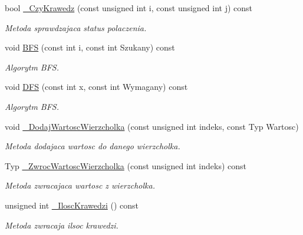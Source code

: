\begin{DoxyCompactItemize}
bool \hyperlink{class_graf_afa31377701d46bd692a6e430c6965d4b}{\-\_\-\-Czy\-Krawedz} (const unsigned int i, const unsigned int j) const 
\begin{DoxyCompactList}\small\item\em Metoda sprawdzajaca status polaczenia. \end{DoxyCompactList}\item 
void \hyperlink{class_graf_a1cef49af91f2d8b6f157e9dd06066d60}{B\-F\-S} (const int i, const int Szukany) const 
\begin{DoxyCompactList}\small\item\em Algorytm B\-F\-S. \end{DoxyCompactList}\item 
void \hyperlink{class_graf_a54e531a5abc04c9aaff81bd76aec5591}{D\-F\-S} (const int x, const int Wymagany) const 
\begin{DoxyCompactList}\small\item\em Algorytm B\-F\-S. \end{DoxyCompactList}\item 
void \hyperlink{class_graf_ae4fa759125334d0361226c4fa2dbf35e}{\-\_\-\-Dodaj\-Wartosc\-Wierzcholka} (const unsigned int indeks, const Typ Wartosc)
\begin{DoxyCompactList}\small\item\em Metoda dodajaca wartosc do danego wierzcholka. \end{DoxyCompactList}\item 
Typ \hyperlink{class_graf_a9198e4a7a0328ab5275713b4141fbb30}{\-\_\-\-Zwroc\-Wartosc\-Wierzcholka} (const unsigned int indeks) const 
\begin{DoxyCompactList}\small\item\em Metoda zwracajaca wartosc z wierzcholka. \end{DoxyCompactList}\item 
unsigned int \hyperlink{class_graf_adf42e78308217f1abbb79818abd04cdf}{\-\_\-\-Ilosc\-Krawedzi} () const 
\begin{DoxyCompactList}\small\item\em Metoda zwracaja ilsoc krawedzi. \end{DoxyCompactList}\end{DoxyCompactItemize}
